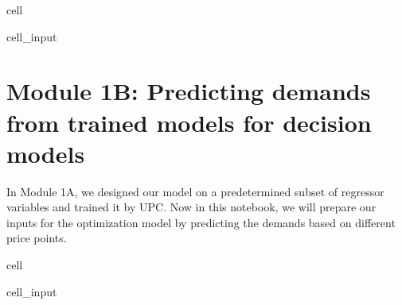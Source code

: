 \documentclass[letterpaper,10pt,english]{jupyterBook}
\begin{document}
\begin{sphinxuseclass}{cell}\begin{sphinxVerbatimInput}

\begin{sphinxuseclass}{cell_input}
\begin{sphinxVerbatim}[commandchars=\\\{\}]
 
   
      
    \PYG{p}{[}\PYG{p}{]}  
\end{sphinxVerbatim}

\end{sphinxuseclass}\end{sphinxVerbatimInput}

\end{sphinxuseclass}
\sphinxstepscope


\section{Module 1B: Predicting demands from trained models for decision models}
\label{\detokenize{docs/Case1_3_Module1B_Retail_Demand_Predict:module-1b-predicting-demands-from-trained-models-for-decision-models}}\label{\detokenize{docs/Case1_3_Module1B_Retail_Demand_Predict::doc}}
\sphinxAtStartPar
{}

\sphinxAtStartPar
In Module 1A, we designed our model on a predetermined subset of regressor variables and trained it by UPC. Now in this notebook, we will prepare our inputs for the optimization model by predicting the demands based on different price points.

\begin{sphinxuseclass}{cell}\begin{sphinxVerbatimInput}

\begin{sphinxuseclass}{cell_input}
\begin{sphinxVerbatim}[commandchars=\\\{\}]
 
 
   
\end{sphinxVerbatim}

\end{sphinxuseclass}\end{sphinxVerbatimInput}

\end{sphinxuseclass}
\end{document}
